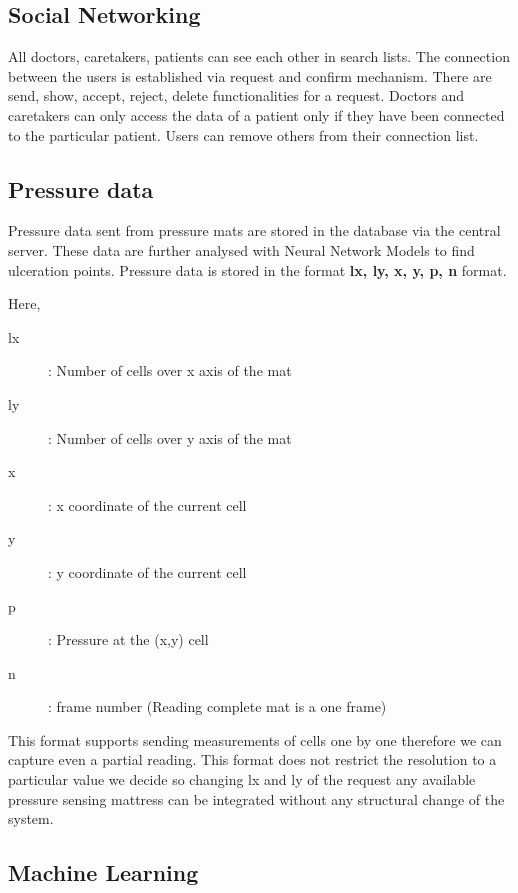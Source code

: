 \subsection{Social Networking}

All doctors, caretakers, patients can see each other in search lists. The connection between the users is established via request and confirm mechanism. There are send, show, accept, reject, delete functionalities for a request. Doctors and caretakers can only access the data of a patient only if they have been connected to the particular patient. Users can remove others from their connection list. 

\subsection{Pressure data}

Pressure data sent from pressure mats are stored in the database via the central server. These data are further analysed with Neural Network Models to find ulceration points. Pressure data is stored in the format \textbf{lx, ly, x, y, p, n} format. 

Here,

\begin{description}
	\item[lx]: Number of cells over x axis of the mat 
	\item[ly]: Number of cells over y axis of the mat 
	\item[x]: x coordinate of the current cell 
	\item[y]: y coordinate of the current cell  
	\item[p]: Pressure at the (x,y) cell
	\item[n]: frame number (Reading complete mat is a one frame)  
\end{description}

This format supports sending measurements of cells one by one therefore we can capture even a partial reading. This format does not restrict the resolution to a particular value we decide so changing lx and ly of the request any available pressure sensing mattress can be integrated without any structural change of the system. 

\subsection{Machine Learning}

